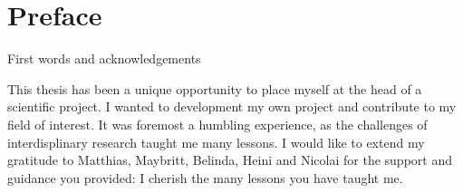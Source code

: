 \chapter*{Preface}

First words and acknowledgements

This thesis has been a unique opportunity to place myself at the head of a scientific project. I wanted to development my own project and contribute to my field of interest. It was foremost a humbling experience, as the challenges of interdisplinary research taught me many lessons. I would like to extend my gratitude to Matthias, Maybritt, Belinda, Heini and Nicolai for the support and guidance you provided: I cherish the many lessons you have taught me. 

